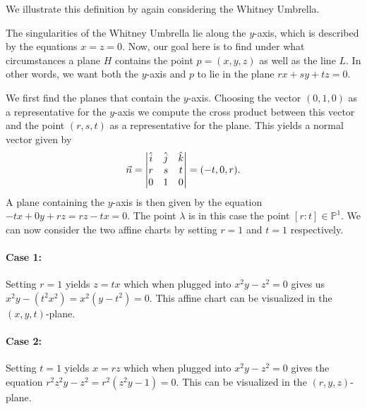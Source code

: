 \documentclass{article}
\renewcommand{\P}{\ensuremath{\mathbb{P}}}
\begin{document}
    We illustrate this definition by again considering the Whitney Umbrella.
    \begin{example}
        The singularities of the Whitney Umbrella lie along the $y$-axis, which
        is described by the equations $x = z = 0$. Now, our goal here is to
        find under what circumstances a plane $H$ contains the point $p = (x,
        y, z)$ as well as the line $L$. In other words, we want both the
        $y$-axis and $p$ to lie in the plane $rx + sy + tz = 0$.
    
        We first find the planes that contain the $y$-axis. Choosing the vector
        $(0, 1, 0)$ as a representative for the $y$-axis we compute the cross
        product between this vector and the point $(r, s, t)$ as a
        representative for the plane. This yields a normal vector given by
        \begin{equation}
            \notag
            \vec{n} = \begin{vmatrix}
                \hat{i} & \hat{j} & \hat{k} \\
                r & s & t \\
                0 & 1 & 0
            \end{vmatrix} = (-t, 0, r).
        \end{equation}
        A plane containing the $y$-axis is then given by the equation $-tx + 0y
        + rz = rz - tx = 0$. The point $\lambda$ is in this case the point $[r:
        t] \in \P^1$. We can now consider the two affine charts by setting $r =
        1$ and $t = 1$ respectively.

        \paragraph{Case 1:} 
        \label{par:case_1_}
        Setting $r = 1$ yields $z = tx$ which when plugged into $x^2y - z^2 = 0$
        gives us $x^2y - (t^2x^2) = x^2(y - t^2) = 0$. This affine chart can be
        visualized in the $(x, y, t)$-plane.

        \paragraph{Case 2:}
        \label{par:case_2_}
        Setting $t = 1$ yields $x = rz$ which when plugged into $x^2y-z^2 = 0$
        gives the equation $r^2z^2y - z^2 = r^2(z^2y - 1) = 0$. This can be
        visualized in the $(r, y, z)$-plane.


\end{example}
\end{document}
